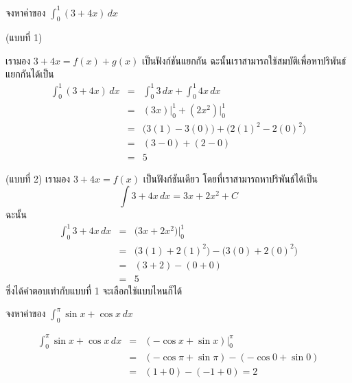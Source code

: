 \begin{frame}[t]
\begin{ex}
จงหาค่าของ $\int_0^1 (3 + 4x) \, dx$
\end{ex}
\begin{sol} (แบบที่ 1)

เรามอง $3 + 4x = f(x) + g(x)$ เป็นฟังก์ชันแยกกัน ฉะนั้นเราสามารถใช้สมบัติเพื่อหาปริพันธ์แยกกันได้เป็น
\begin{eqnarray*}
\int_0^1 (3+4x) \, dx &=& \int_0^1 3 \, dx + \int_0^1 4x \, dx \\
&=& (3x)\Big|_0^1 + (2x^2)\Big|_0^1 \\
&=& \Big(3(1) - 3(0)\Big) + \Big(2(1)^2 - 2(0)^2 \Big) \\
&=& (3-0) + (2-0) \\
&=& 5
\end{eqnarray*}
\end{sol}
\end{frame}

\begin{frame}[t]
\begin{sol} (แบบที่ 2)
เรามอง $3 + 4x = f(x)$ เป็นฟังก์ชันเดียว โดยที่เราสามารถหาปริพันธ์ได้เป็น
\[ \int 3+4x \, dx = 3x + 2x^2 + C \]
ฉะนั้น
\begin{eqnarray*}
\int_0^1 3+4x \, dx &=& \Big( 3x + 2x^2 \Big)\Big|_0^1 \\
&=& \Big(3(1) + 2(1)^2 \Big) - \Big(3(0) + 2(0)^2\Big) \\
&=& (3+2) - (0+0) \\
&=& 5
\end{eqnarray*}
ซึ่งได้คำตอบเท่ากับแบบที่ 1 จะเลือกใช้แบบไหนก็ได้
\end{sol}
\end{frame}

\begin{frame}[t]
\begin{ex}
จงหาค่าของ $\int_{0}^{\pi} \sin x + \cos x \, dx$
\end{ex}
\begin{sol}
\begin{eqnarray*}
\int_{0}^{\pi} \sin x + \cos x \, dx &=& \left(-\cos x + \sin x\right) \Big|_0^{\pi} \\
&=& (-\cos \pi + \sin \pi) - (-\cos 0 + \sin 0) \\
&=& (1 + 0) - (-1 + 0) = 2
\end{eqnarray*}
\end{sol}
\end{frame}

